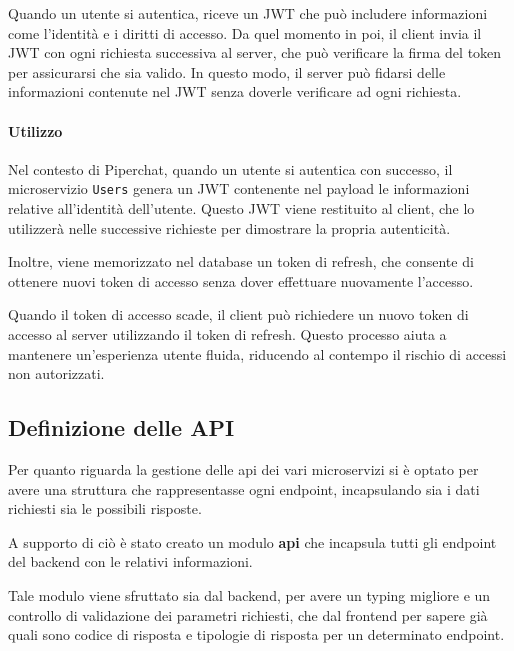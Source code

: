 Quando un utente si autentica, riceve un JWT che può includere informazioni come l'identità e i diritti di accesso. Da quel momento in poi, il client invia il JWT con ogni richiesta successiva al server, che può verificare la firma del token per assicurarsi che sia valido. In questo modo, il server può fidarsi delle informazioni contenute nel JWT senza doverle verificare ad ogni richiesta.

%
%
%
\paragraph{Utilizzo}

Nel contesto di Piperchat, quando un utente si autentica con successo, il microservizio \texttt{Users} genera un JWT contenente nel payload le informazioni relative all'identità dell'utente. Questo JWT viene restituito al client, che lo utilizzerà nelle successive richieste per dimostrare la propria autenticità.

Inoltre, viene memorizzato nel database un token di refresh, che consente di ottenere nuovi token di accesso senza dover effettuare nuovamente l'accesso.

Quando il token di accesso scade, il client può richiedere un nuovo token di accesso al server utilizzando il token di refresh. Questo processo aiuta a mantenere un'esperienza utente fluida, riducendo al contempo il rischio di accessi non autorizzati.


%
%
%
\subsection{Definizione delle API}

Per quanto riguarda la gestione delle api dei vari microservizi si è optato per avere una struttura che rappresentasse ogni endpoint, incapsulando sia i dati richiesti sia le possibili risposte.

A supporto di ciò è stato creato un modulo \textbf{api} che incapsula tutti gli endpoint del backend con le relativi informazioni.

Tale modulo viene sfruttato sia dal backend, per avere un typing migliore e un controllo di validazione dei parametri richiesti, che dal frontend per sapere già quali sono codice di risposta e tipologie di risposta per un determinato endpoint.

